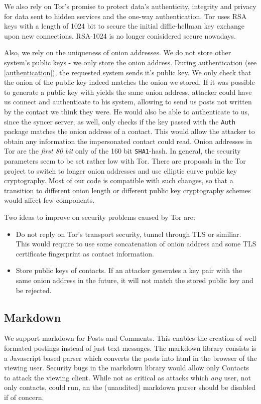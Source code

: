\documentclass[12pt]{article}
\begin{document}
We also rely on Tor's promise to protect data's authenticity, integrity and privacy for data sent to hidden services and the one-way authentication. Tor uses RSA keys with a length of 1024 bit to secure the initial diffie-hellman key exchange upon new connections. RSA-1024 is no longer conisidered secure nowadays.

Also, we rely on the uniqueness of onion addresses. We do not store other system's public keys - we only store the onion address. During authentication (see \autoref{authentication}), the requested system sends it's public key. We only check that the onion of the public key indeed matches the onion we stored. If it was possible to generate a public key with yields the same onion address, attacker could have us connect and authenticate to his system, allowing to send us posts not written by the contact we think they were. He would also be able to authenticate to us, since the syncer server, as well, only checks if the key passed with the \texttt{Auth} package matches the onion address of a contact. This would allow the attacker to obtain any information the impersonated contact could read. Onion addresses in Tor are the \textit{first 80 bit} only of the 160 bit \texttt{SHA1}-hash. In general, the security parameters seem to be set rather low with Tor. There are proposals in the Tor project to switch to longer onion addresses and use elliptic curve public key cryptography. Most of our code is compatible with such changes, so that a transition to different onion length or different public key cryptography schemes would affect few components.

Two ideas to improve on security problems caused by Tor are:
\begin{itemize}
\item Do not reply on Tor's transport security, tunnel through TLS or similiar. This would require to use some concatenation of onion address and some TLS certificate fingerprint as contact information.
\item Store public keys of contacts. If an attacker generates a key pair with the same onion address in the future, it will not match the stored public key and be rejected.
\end{itemize}

\subsection{Markdown}

We support markdown for Posts and Comments. This enables the creation of well formated postings instead of just text messages. The markdown library consists is a Javascript based parser which converts the posts into html in the browser of the viewing user. Security bugs in the markdown library would allow only Contacts to attack the viewing client. While not as critical as attacks which \textit{any} user, not only contacts, could run, an the (unaudited) markdown parser should be disabled if of concern.
\end{document}
